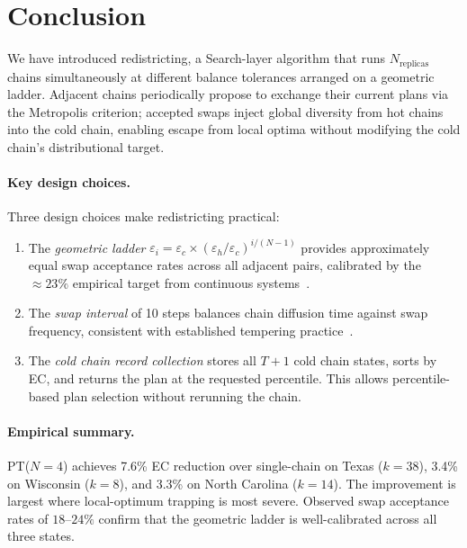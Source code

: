 \section{Conclusion}
\label{sec:conclusion}

We have introduced \pt{} redistricting, a Search-layer algorithm that runs
$N_{\mathrm{replicas}}$ \fr{} chains simultaneously at different balance tolerances
arranged on a geometric ladder.
Adjacent chains periodically propose to exchange their current plans via the
Metropolis criterion; accepted swaps inject global diversity from hot chains
into the cold chain, enabling escape from local optima without modifying the
cold chain's distributional target.

\paragraph{Key design choices.}
Three design choices make \pt{} redistricting practical:
\begin{enumerate}
\item The \emph{geometric ladder} $\varepsilon_i = \varepsilon_c \times
  (\varepsilon_h/\varepsilon_c)^{i/(N-1)}$ provides approximately equal swap
  acceptance rates across all adjacent pairs, calibrated by the ${\approx}23\%$
  empirical target from continuous systems~\citep{kone2005}.
\item The \emph{swap interval} of 10 steps balances chain diffusion time
  against swap frequency, consistent with established tempering practice~\citep{earl2005}.
\item The \emph{cold chain record collection} stores all $T+1$ cold chain
  states, sorts by EC, and returns the plan at the requested percentile.
  This allows percentile-based plan selection without rerunning the chain.
\end{enumerate}

\paragraph{Empirical summary.}
PT($N=4$) achieves 7.6\% EC reduction over single-chain \fr{} on Texas ($k=38$),
3.4\% on Wisconsin ($k=8$), and 3.3\% on North Carolina ($k=14$).
The improvement is largest where local-optimum trapping is most severe.
Observed swap acceptance rates of $18$--$24\%$ confirm that the geometric
ladder is well-calibrated across all three states.

